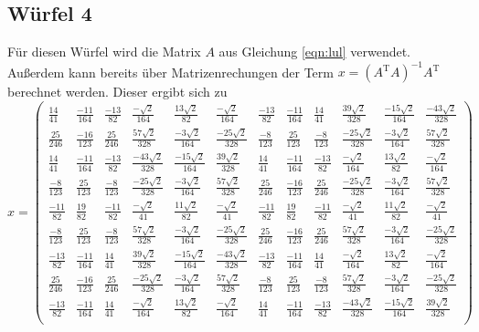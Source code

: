 \subsection{Würfel 4}
Für diesen Würfel wird die Matrix $A$ aus Gleichung \eqref{eqn:lul} verwendet. Außerdem kann bereits über Matrizenrechungen der Term $x = (A^{\text{T}}A)^{-1} A^{\text{T}}$ berechnet werden. Dieser ergibt sich zu
\setcounter{MaxMatrixCols}{20}
\begin{equation*}
    x =
\begin{pmatrix}
    \frac{14}{41} & \frac{-11}{164} & \frac{-13}{82} & \frac{-\sqrt{2}}{164} & \frac{13\sqrt{2}}{82} & \frac{-\sqrt{2}}{164} & \frac{-13}{82} & \frac{-11}{164} & \frac{14}{41} & \frac{39\sqrt{2}}{328} & \frac{-15\sqrt{2}}{164} & \frac{-43\sqrt{2}}{328} \\
    \frac{25}{246} & \frac{-16}{123} & \frac{25}{246} & \frac{57\sqrt{2}}{328} & \frac{-3\sqrt{2}}{164} & \frac{-25\sqrt{2}}{328} & \frac{-8}{123} & \frac{25}{123} & \frac{-8}{123} & \frac{-25\sqrt{2}}{328} & \frac{-3\sqrt{2}}{164} & \frac{57\sqrt{2}}{328} \\
    \frac{14}{41} & \frac{-11}{164} & \frac{-13}{82} & \frac{-43\sqrt{2}}{328} & \frac{-15\sqrt{2}}{164} & \frac{39\sqrt{2}}{328} & \frac{14}{41} & \frac{-11}{164} & \frac{-13}{82} & \frac{-\sqrt{2}}{164} & \frac{13\sqrt{2}}{82} & \frac{-\sqrt{2}}{164} \\
    \frac{-8}{123} & \frac{25}{123} & \frac{-8}{123} & \frac{-25\sqrt{2}}{328} & \frac{-3\sqrt{2}}{164} & \frac{57\sqrt{2}}{328} & \frac{25}{246} & \frac{-16}{123} & \frac{25}{246} & \frac{-25\sqrt{2}}{328} & \frac{-3\sqrt{2}}{164} & \frac{57\sqrt{2}}{328} \\
    \frac{-11}{82} & \frac{19}{82} & \frac{-11}{82} & \frac{-\sqrt{2}}{41} & \frac{11\sqrt{2}}{82} & \frac{-\sqrt{2}}{41} & \frac{-11}{82} & \frac{19}{82} & \frac{-11}{82} & \frac{-\sqrt{2}}{41} & \frac{11\sqrt{2}}{82} & \frac{-\sqrt{2}}{41} \\
    \frac{-8}{123} & \frac{25}{123} & \frac{-8}{123} & \frac{57\sqrt{2}}{328} & \frac{-3\sqrt{2}}{164} & \frac{-25\sqrt{2}}{328} & \frac{25}{246} & \frac{-16}{123} & \frac{25}{246} & \frac{57\sqrt{2}}{328} & \frac{-3\sqrt{2}}{164} & \frac{-25\sqrt{2}}{328} \\
    \frac{-13}{82} & \frac{-11}{164} & \frac{14}{41} & \frac{39\sqrt{2}}{328} & \frac{-15\sqrt{2}}{164} & \frac{-43\sqrt{2}}{328} & \frac{-13}{82} & \frac{-11}{164} & \frac{14}{41} & \frac{-\sqrt{2}}{164} & \frac{13\sqrt{2}}{82} & \frac{-\sqrt{2}}{164} \\
    \frac{25}{246} & \frac{-16}{123} & \frac{25}{246} & \frac{-25\sqrt{2}}{328} & \frac{-3\sqrt{2}}{164} & \frac{57\sqrt{2}}{328} & \frac{-8}{123} & \frac{25}{123} & \frac{-8}{123} & \frac{57\sqrt{2}}{328} & \frac{-3\sqrt{2}}{164} & \frac{-25\sqrt{2}}{328} \\
    \frac{-13}{82} & \frac{-11}{164} & \frac{14}{41} & \frac{-\sqrt{2}}{164} & \frac{13\sqrt{2}}{82} & \frac{-\sqrt{2}}{164} & \frac{14}{41} & \frac{-11}{164} & \frac{-13}{82} & \frac{-43\sqrt{2}}{328} & \frac{-15\sqrt{2}}{164} & \frac{39\sqrt{2}}{328} \\
\end{pmatrix}
\end{equation*}
